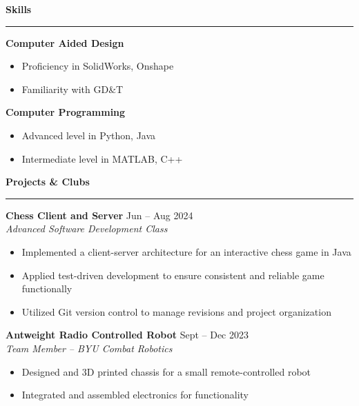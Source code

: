 \documentclass[a4paper,10pt]{article}
\newcommand{\sectionline}{\noindent\rule{\linewidth}{1pt}\vspace{-0.5em}}  %
\begin{document}
\textbf{\large Skills} \vspace{-1em}\\
\sectionline
\vspace{-0.5em}
\begin{multicols}{2}
    \textbf{Computer Aided Design}
    \begin{itemize}[noitemsep, topsep=0pt]
        \item Proficiency in SolidWorks, Onshape
        \item Familiarity with GD\&T
    \end{itemize}

    \columnbreak

    \textbf{Computer Programming}
    \begin{itemize}[noitemsep, topsep=0pt]
        \item Advanced level in Python, Java
        \item Intermediate level in MATLAB, C++
    \end{itemize}
\end{multicols}
\vspace{-1em}

\textbf{\large Projects \& Clubs} \vspace{-1em}\\
\sectionline

\textbf{Chess Client and Server} \hfill Jun -- Aug 2024 \\
\emph{Advanced Software Development Class}
\begin{itemize}[noitemsep, topsep=0pt]
    \item Implemented a client-server architecture for an interactive chess game in Java
    \item Applied test-driven development to ensure consistent and reliable game functionally
    \item Utilized Git version control to manage revisions and project organization 
\end{itemize}

\textbf{Antweight Radio Controlled Robot} \hfill Sept -- Dec 2023 \\
\emph{Team Member -- BYU Combat Robotics}
\begin{itemize}[noitemsep, topsep=0pt]
    \item Designed and 3D printed chassis for a small remote-controlled robot
    \item Integrated and assembled electronics for functionality
\end{itemize}
\end{document}
